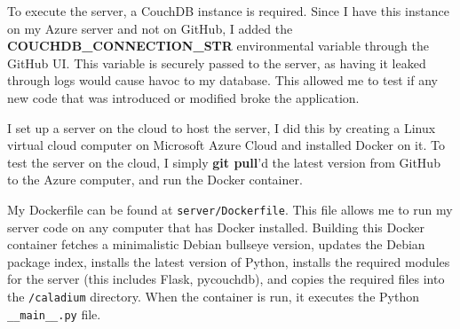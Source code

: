 To execute the server, a CouchDB instance is required.
Since I have this instance on my Azure server and not on GitHub, I added the \\
\textbf{COUCHDB\_CONNECTION\_STR}
environmental variable through the GitHub UI.
This variable is securely passed to the server,
as having it leaked through logs would cause havoc to my database.
This allowed me to test if any new code that was introduced or modified broke the application.

I set up a server on the cloud to host the server,
I did this by creating a Linux virtual cloud computer on
Microsoft Azure Cloud and installed Docker on it.
To test the server on the cloud, I simply \textbf{git pull}'d
the latest version from GitHub to the Azure computer,
and run the Docker container.

My Dockerfile can be found at \texttt{server/Dockerfile}.
This file allows me to run my server code on any computer that has Docker installed.
Building this Docker container fetches a minimalistic Debian bullseye version,
updates the Debian package index, installs the latest version of Python,
installs the required modules for the server (this includes Flask, pycouchdb),
and copies the required files into the \texttt{/caladium} directory.
When the container is run, it executes the Python \texttt{\_\_main\_\_.py} file.
